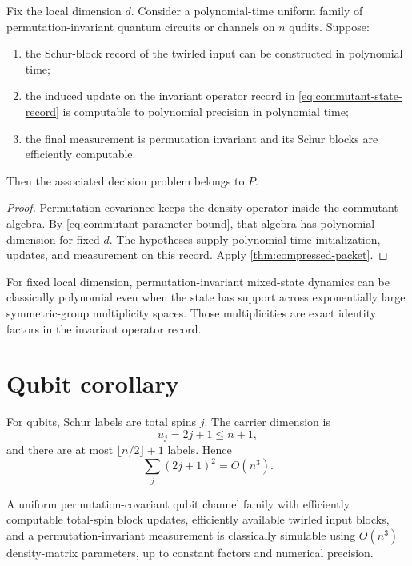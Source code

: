 \begin{theorem}
\label{thm:schur-commutant-collapse}
Fix the local dimension $d$. Consider a polynomial-time uniform family of permutation-invariant quantum circuits or channels on $n$ qudits. Suppose:
\begin{enumerate}
\item the Schur-block record of the twirled input can be constructed in polynomial time;
\item the induced update on the invariant operator record in \cref{eq:commutant-state-record} is computable to polynomial precision in polynomial time;
\item the final measurement is permutation invariant and its Schur blocks are efficiently computable.
\end{enumerate}
Then the associated decision problem belongs to $P$.
\end{theorem}

\begin{proof}
Permutation covariance keeps the density operator inside the commutant algebra. By \cref{eq:commutant-parameter-bound}, that algebra has polynomial dimension for fixed $d$. The hypotheses supply polynomial-time initialization, updates, and measurement on this record. Apply \cref{thm:compressed-packet}.
\end{proof}

\begin{derivedbox}
For fixed local dimension, permutation-invariant mixed-state dynamics can be classically polynomial even when the state has support across exponentially large symmetric-group multiplicity spaces. Those multiplicities are exact identity factors in the invariant operator record.
\end{derivedbox}

\section{Qubit corollary}
For qubits, Schur labels are total spins $j$. The carrier dimension is
\[
u_j=2j+1\le n+1,
\]
and there are at most $\lfloor n/2\rfloor+1$ labels. Hence
\begin{equation}
\sum_j(2j+1)^2=O(n^3).
\label{eq:qubit-commutant-size}
\end{equation}

\begin{corollary}
\label{cor:perm-invariant-qubit-channels}
A uniform permutation-covariant qubit channel family with efficiently computable total-spin block updates, efficiently available twirled input blocks, and a permutation-invariant measurement is classically simulable using $O(n^3)$ density-matrix parameters, up to constant factors and numerical precision.
\end{corollary}

